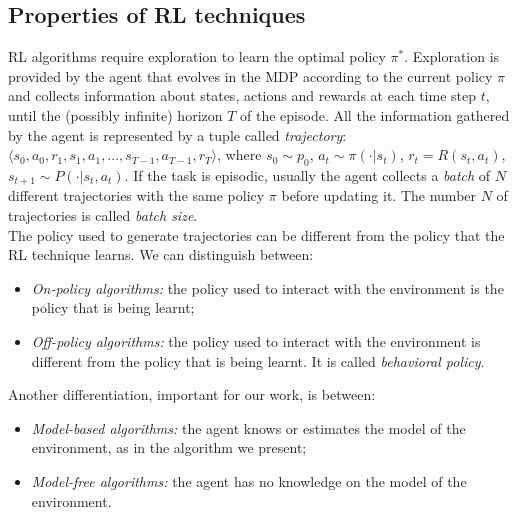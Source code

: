 \subsection{Properties of \ac{RL} techniques}
\ac{RL} algorithms require exploration to learn the optimal policy $\pi^{*}$. Exploration is provided by the agent that evolves in the \ac{MDP} according to the current policy $\pi$ and collects information about states, actions and rewards at each time step $t$, until the (possibly infinite) horizon $T$ of the episode. All the information gathered by the agent is represented by a tuple called \emph{trajectory}: $\langle s_0, a_0, r_1, s_1, a_1, ..., s_{T-1}, a_{T-1}, r_{T} \rangle$, where $s_{0} \sim p_0$, $a_{t} \sim \pi(\cdot|s_{t})$, $r_{t} = R(s_{t}, a_{t})$, $s_{t+1} \sim P(\cdot|s_{t}, a_{t})$. If the task is episodic, usually the agent collects a \emph{batch} of $N$ different trajectories with the same policy $\pi$ before updating it. The number $N$ of trajectories is called \emph{batch size}.\\
\newline
The policy used to generate trajectories can be different from the policy that the \ac{RL} technique learns. We can distinguish between:
\begin{itemize}
	\item \emph{On-policy algorithms:} the policy used to interact with the environment is the policy that is being learnt;
	\item \emph{Off-policy algorithms:} the policy used to interact with the environment is different from the policy that is being learnt. It is called \emph{behavioral policy}.
\end{itemize}
Another differentiation, important for our work, is between:
\begin{itemize}
	\item \emph{Model-based algorithms:} the agent knows or estimates the model of the environment, as in the algorithm we present;
	\item \emph{Model-free algorithms:} the agent has no knowledge on the model of the environment.
\end{itemize}

